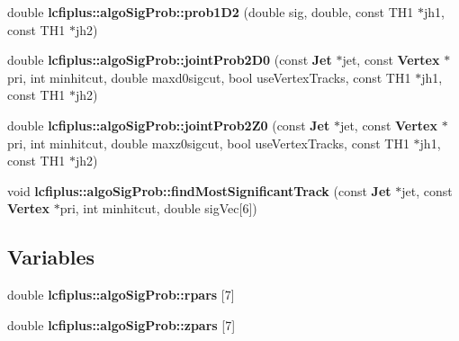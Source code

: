\begin{DoxyCompactItemize}
\item 
double \textbf{ lcfiplus\+::algo\+Sig\+Prob\+::prob1\+D2} (double sig, double, const T\+H1 $\ast$jh1, const T\+H1 $\ast$jh2)
\item 
double \textbf{ lcfiplus\+::algo\+Sig\+Prob\+::joint\+Prob2\+D0} (const \textbf{ Jet} $\ast$jet, const \textbf{ Vertex} $\ast$pri, int minhitcut, double maxd0sigcut, bool use\+Vertex\+Tracks, const T\+H1 $\ast$jh1, const T\+H1 $\ast$jh2)
\item 
double \textbf{ lcfiplus\+::algo\+Sig\+Prob\+::joint\+Prob2\+Z0} (const \textbf{ Jet} $\ast$jet, const \textbf{ Vertex} $\ast$pri, int minhitcut, double maxz0sigcut, bool use\+Vertex\+Tracks, const T\+H1 $\ast$jh1, const T\+H1 $\ast$jh2)
\item 
void \textbf{ lcfiplus\+::algo\+Sig\+Prob\+::find\+Most\+Significant\+Track} (const \textbf{ Jet} $\ast$jet, const \textbf{ Vertex} $\ast$pri, int minhitcut, double sig\+Vec[6])
\end{DoxyCompactItemize}
\subsection*{Variables}
\begin{DoxyCompactItemize}
\item 
double \textbf{ lcfiplus\+::algo\+Sig\+Prob\+::rpars} [7]
\item 
double \textbf{ lcfiplus\+::algo\+Sig\+Prob\+::zpars} [7]
\end{DoxyCompactItemize}
